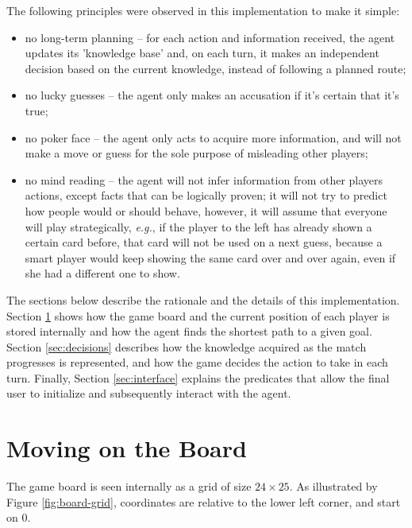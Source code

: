 \documentclass[12pt,a4paper]{article}
\begin{document}
The following principles were observed in this implementation to make it simple:
\begin{itemize}
    \item no long-term planning -- for each action and information received, the agent updates its 'knowledge base' and, on each turn, it makes an independent decision based on the current knowledge, instead of following a planned route;
    
    \item no lucky guesses -- the agent only makes an accusation if it's certain that it's true;
    
    \item no poker face -- the agent only acts to acquire more information, and will not make a move or guess for the sole purpose of misleading other players;
    
    \item no mind reading -- the agent will not infer information from other players actions, except facts that can be logically proven; it will not try to predict how people would or should behave, however, it will assume that everyone will play strategically, \textit{e.g.}, if the player to the left has already shown a certain card before, that card will not be used on a next guess, because a smart player would keep showing the same card over and over again, even if she had a different one to show.
\end{itemize}

The sections below describe the rationale and the details of this implementation. Section \ref{sec:board} shows how the game board and the current position of each player is stored internally and how the agent finds the shortest path to a given goal. Section \ref{sec:decisions} describes how the knowledge acquired as the match progresses is represented, and how the game decides the action to take in each turn. Finally, Section \ref{sec:interface} explains the predicates that allow the final user to initialize and subsequently interact with the agent.

\section{Moving on the Board}
\label{sec:board}

The game board is seen internally as a grid of size $24\times25$. As illustrated by Figure \ref{fig:board-grid}, coordinates are relative to the lower left corner, and start on $0$.
\end{document}
